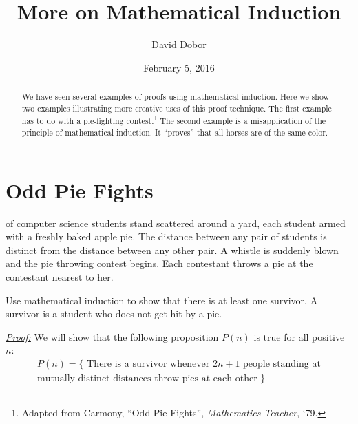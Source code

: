 \documentclass{tufte-handout}
\title{More on Mathematical Induction}
\author{David Dobor}
\date{February 5, 2016} %
\begin{document}
\maketitle%

\begin{abstract}
\noindent We have seen several examples of proofs using mathematical induction. Here we show two examples illustrating more creative uses of this proof technique. The first example has to do with a pie-fighting contest.\thanks{Adapted from Carmony, ``Odd Pie Fights'', \textit{Mathematics Teacher}, `79.} The second example is a misapplication of the principle of mathematical induction.  It ``proves'' that all horses are of the same color. 

\end{abstract}

\bigskip
\section{Odd Pie Fights}
 of computer science students stand scattered around a yard, each student armed with a freshly baked apple pie.  The distance between any pair of students is distinct from the distance between any other pair. A whistle is suddenly blown and the pie throwing contest begins. Each contestant throws a pie at the contestant nearest to her. 

\bigskip
Use mathematical induction to show that there is at least one survivor. A survivor is a student who does not get hit by a pie.  

\bigskip
\textit{\underline{Proof:} } We will show that the following proposition $P(n)$ is true for all positive $n$:
\let\thefootnote\relax{}
 \begin{equation*}
 \begin{aligned}
P(n) = \{ \text{ There is a survivor whenever } 2n + 1  \text{ people standing at} \\ 
                                                       \text{mutually distinct distances throw pies at each other }\}
\end{aligned}
\end{equation*}
\end{document}
